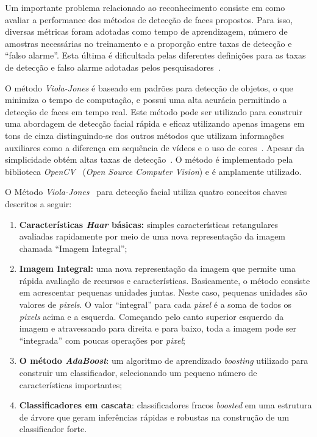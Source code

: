 	Um importante problema relacionado ao reconhecimento consiste em como
	avaliar a performance dos métodos de detecção de faces propostos. Para isso,
	diversas métricas foram adotadas como tempo de aprendizagem, número de amostras
	necessárias no treinamento e a proporção entre taxas de detecção e ``falso alarme''. Esta
	última é dificultada pelas diferentes definições para as taxas de detecção e
	falso alarme adotadas pelos pesquisadores~\cite{yang}.
	
	O método \textit{Viola-Jones} é baseado em padrões para detecção de objetos, o
	que minimiza o tempo de computação, e possui uma alta acurácia permitindo a
	detecção de faces em tempo real. Este método pode ser utilizado para construir
	uma abordagem de detecção facial rápida e eficaz utilizando apenas imagens em
	tons de cinza distinguindo-se dos outros métodos que utilizam informações
	auxiliares como a diferença em sequência de vídeos e o uso de
	cores~\cite{edsonma, violajones}. Apesar da simplicidade obtém altas taxas de
	detecção~\cite{edsonma}. O método é implementado pela biblioteca
	\textit{OpenCV}~\cite{opencv_library} (\textit{Open Source Computer Vision}) e é amplamente utilizado.
	
	O Método \textit{Viola-Jones}~\cite{servodetection,violajones,edsonma} para
	detecção facial utiliza quatro conceitos chaves descritos a seguir:
		
	\begin{enumerate}
		\item \textbf{Características \textit{Haar} básicas:} simples características
		retangulares avaliadas rapidamente por meio de uma nova representação da imagem
		chamada ``Imagem Integral'';
		
		\item \textbf{Imagem Integral:} uma nova representação da imagem que permite uma
		rápida avaliação de recursos e características. Basicamente, o método consiste
		em acrescentar pequenas unidades juntas. Neste caso, pequenas unidades são
		valores de \textit{pixels}. O valor ``integral'' para cada \textit{pixel} é a
		soma de todos os \textit{pixels} acima e a esquerda. Começando pelo canto
		superior esquerdo da imagem e atravessando para direita e para baixo, toda a
		imagem pode ser ``integrada'' com poucas operações por
		\textit{pixel};
		
		\item \textbf{O método \textit{AdaBoost}}: um algoritmo de aprendizado
		\textit{boosting} utilizado para construir um classificador, selecionando um
		pequeno número de características importantes;
		
		\item \textbf{Classificadores em cascata}: classificadores fracos
		\textit{boosted} em uma estrutura de árvore que geram inferências rápidas e
		robustas na construção de um classificador
		forte.
	\end{enumerate}

